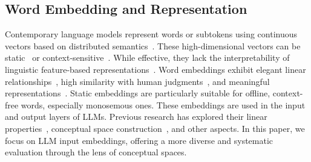 


\subsection{Word Embedding and Representation}
Contemporary language models represent words or subtokens using continuous vectors based on distributed semantics~\cite{boleda2020distributional}. These high-dimensional vectors can be static~\cite{Mikolov2013distributed,Bojanowski2017subword} or context-sensitive~\cite{devlin2019bert}. While effective, they lack the interpretability of linguistic feature-based representations~\cite{petersen2023lexical}. Word embeddings exhibit elegant linear relationships~\cite{Mikolov2013distributed}, high similarity with human judgments~\cite{vulic2020probing}, and meaningful representations~\cite{Turney2010vector}. Static embeddings are particularly suitable for offline, context-free words, especially monosemous ones. These embeddings are used in the input and output layers of LLMs. Previous research has explored their linear properties~\cite{han2024word}, conceptual space construction~\cite{moullec2025cheaper}, and other aspects. In this paper, we focus on LLM input embeddings, offering a more diverse and systematic evaluation through the lens of conceptual spaces.



